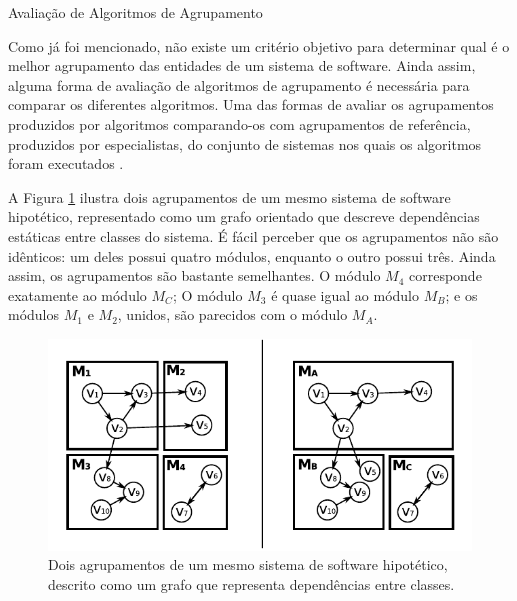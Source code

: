 \begin{section}{Avaliação de Algoritmos de Agrupamento} \label{sec:fundamentos-avaliacao}

Como já foi mencionado, não existe um critério objetivo para determinar qual é o melhor agrupamento das entidades de um sistema de software. Ainda assim, alguma forma de avaliação de algoritmos de agrupamento é necessária para comparar os diferentes algoritmos. Uma das formas de avaliar os agrupamentos produzidos por algoritmos comparando-os com agrupamentos de referência, produzidos por especialistas, do conjunto de sistemas nos quais os algoritmos foram executados \cite{Koschke2000}.

A Figura \ref{fig:mojo} ilustra dois agrupamentos de um mesmo sistema de software hipotético, representado como um grafo orientado que descreve dependências estáticas entre classes do sistema. É fácil perceber que os agrupamentos não são idênticos: um deles possui quatro módulos, enquanto o outro possui três. Ainda assim, os agrupamentos são bastante semelhantes. O módulo $M_4$ corresponde exatamente ao módulo $M_C$; O módulo $M_3$ é quase igual ao módulo $M_B$; e os módulos $M_1$ e $M_2$, unidos, são parecidos com o módulo $M_A$.

\begin{figure}[htbp]
	\centering
		\includegraphics[scale=1]{figuras/redes-dupla}
	\caption{Dois agrupamentos de um mesmo sistema de software hipotético, descrito como um grafo que representa dependências entre classes.}
	\label{fig:mojo}
\end{figure}



\end{section}
